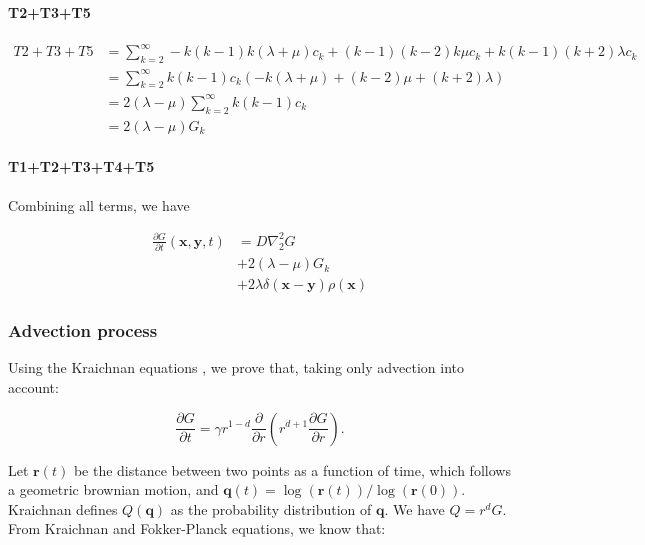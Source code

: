 \paragraph*{T2+T3+T5}

\begin{subequations}

\begin{align}
T2+T3+T5 & =\sum_{k=2}^{\infty}-k(k-1)k(\lambda+\mu)c_{k}+(k-1)(k-2)k\mu c_{k}+k(k-1)(k+2)\lambda c_{k}\label{la-1-1}\\
 & =\sum_{k=2}^{\infty}k(k-1)c_{k}(-k(\lambda+\mu)+(k-2)\mu+(k+2)\lambda)\\
 & =2(\lambda-\mu)\sum_{k=2}^{\infty}k(k-1)c_{k}\\
 & =2(\lambda-\mu)G_{k}
\end{align}

\end{subequations}

\paragraph*{T1+T2+T3+T4+T5}

Combining all terms, we have

\begin{subequations} 
\begin{align}
\frac{\partial G}{\partial t}(\boldsymbol{x},\boldsymbol{y},t) & =D\nabla_{2}^{2}G \label{nk_diffusion-1}\\
 & +2(\lambda-\mu)G_{k} \label{nk_same_state-1}\\
 & +2\lambda\delta(\boldsymbol{x}-\boldsymbol{y})\rho(\boldsymbol{x}) \label{nk_death-1}
\end{align}
\end{subequations}

\subsubsection*{Advection process}

Using the Kraichnan equations \cite{kraichnan_convection_1974}, we prove that, taking only advection into account:

\begin{equation}
\frac{\partial G}{\partial t}=\gamma r^{1-d}\frac{\partial}{\partial r}\left(r^{d+1}\frac{\partial G}{\partial r}\right). \label{eq:eq_2_Young_advection}
\end{equation}

Let $\boldsymbol{r}(t)$
be the distance between two points as a function of time, which follows a geometric brownian motion, and $\boldsymbol{q}(t)=\log(\boldsymbol{r}(t))/\log(\boldsymbol{r}(0))$.
Kraichnan defines $Q(\boldsymbol{q})$ as the probability distribution
of $\boldsymbol{q}$. We have $Q=r^{d}G$. From Kraichnan and Fokker-Planck equations, we know that:

